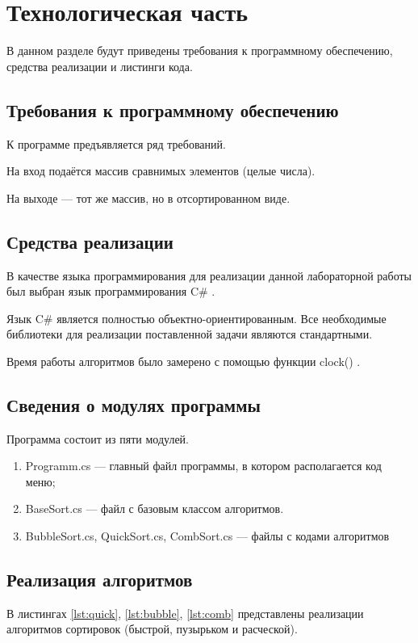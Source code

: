 \chapter{Технологическая часть}

В данном разделе будут приведены требования к программному обеспечению, средства реализации и листинги кода.

\section{Требования к программному обеспечению}

К программе предъявляется ряд требований.

На вход подаётся массив сравнимых элементов (целые числа). 

На выходе — тот же массив, но в отсортированном виде.


\section{Средства реализации}

В качестве языка программирования для реализации данной лабораторной работы был выбран язык программирования C\# \cite{sharplang}. 

Язык C\# является полностью объектно-ориентированным. 
Все необходимые библиотеки для реализации поставленной задачи являются стандартными.

Время работы алгоритмов было замерено с помощью функции clock() \cite{cpplangtime}.

\section{Сведения о модулях программы}
Программа состоит из пяти модулей.
\begin{enumerate}
	\item Programm.cs --- главный файл программы, в котором располагается код меню;
	\item BaseSort.cs --- файл с базовым классом алгоритмов.
	\item BubbleSort.cs, QuickSort.cs, CombSort.cs --- файлы с кодами алгоритмов
\end{enumerate}


\section{Реализация алгоритмов}
В листингах \ref{lst:quick}, \ref{lst:bubble}, \ref{lst:comb} представлены реализации алгоритмов сортировок (быстрой, пузырьком и расческой).

